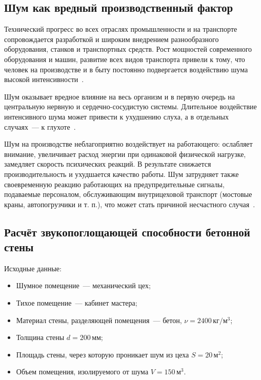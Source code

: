 \subsection{Шум как вредный производственный фактор}
Технический прогресс во всех отраслях промышленности и на транспорте сопровождается разработкой и широким внедрением разнообразного оборудования, станков и транспортных средств. Рост мощностей современного оборудования и машин, развитие всех видов транспорта привели к тому, что человек на производстве и в быту постоянно подвергается воздействию шума высокой интенсивности~\cite{TechLib_NoiseProtection}.

Шум оказывает вредное влияние на весь организм и в первую очередь на центральную нервную и сердечно-сосудистую системы. Длительное воздействие интенсивного шума может привести к ухудшению слуха, а в отдельных случаях~--- к глухоте~\cite{TechLib_NoiseProtection}.

Шум на производстве неблагоприятно воздействует на работающего: ослабляет внимание, увеличивает расход энергии при одинаковой физической нагрузке, замедляет скорость психических реакций. В результате снижается производительность и ухудшается качество работы. Шум затрудняет также своевременную реакцию работающих на предупредительные сигналы, подаваемые персоналом, обслуживающим внутрицеховой транспорт (мостовые краны, автопогрузчики и т. п.), что может стать причиной несчастного случая~\cite{TechLib_NoiseProtection}.

\subsection{Расчёт звукопоглощающей способности бетонной стены}
Исходные данные:
\begin{itemize}
	\item Шумное помещение~--- механический цех;
	\item Тихое помещение~--- кабинет мастера;
	\item Материал стены, разделяющей помещения~--- бетон, $\nu{} = 2400\,\text{кг}/\text{м}^3$;
	\item Толщина стены $d = 200\,\text{мм}$;
	\item Площадь стены, через которую проникает шум из цеха $S = 20\,\text{м}^2$;
	\item Объем помещения, изолируемого от шума $V = 150\,\text{м}^3$.
\end{itemize}

